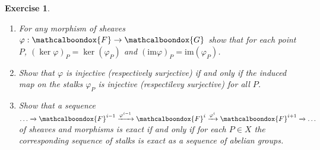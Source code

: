 \documentclass[12pt]{article}
\newcommand{\ima}{\ensuremath{\text{im}}}
\newtheorem{ex}{Exercise}[section]
\theoremstyle{definition}
\newcommand{\sF}{\ensuremath{\mathcalboondox{F}}}
\newcommand{\sG}{\ensuremath{\mathcalboondox{G}}}
\begin{document}
\begin{ex}
	\begin{enumerate}[label=\alph*)]
		\item For any morphism of sheaves $\varphi: \sF \to \sG$ show that for each point $P$, $(\ker \varphi)_P = \ker(\varphi_P)$ and $(\ima \varphi)_P = \ima (\varphi_P)$.
		\item Show that $\varphi$ is injective (respectively surjective) if and only if the induced map on the stalks $\varphi_P$ is injective (respectilevy surjective) for all $P$.
		\item Show that a sequence $\dots \xrightarrow[]{} \sF^{i-1} \xrightarrow[]{\varphi^{i-1}} \sF^{i} \xrightarrow[]{\varphi^{i}} \sF^{i+1} \xrightarrow[]{} \dots$ of sheaves and morphisms is exact if and only if for each $P \in X$ the corresponding sequence of stalks is exact as a sequence of abelian groups.
	\end{enumerate}
\end{ex}
\end{document}
